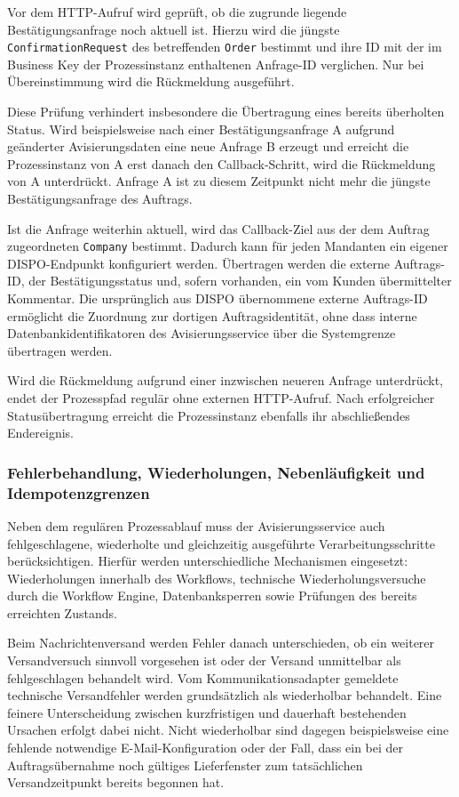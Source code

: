 \documentclass[
  12pt,
  a4paper,
  oneside
]{article}
\begin{document}
Vor dem HTTP-Aufruf wird geprüft, ob die zugrunde liegende
Bestätigungsanfrage noch aktuell ist. Hierzu wird die jüngste
\texttt{ConfirmationRequest} des betreffenden \texttt{Order} bestimmt und ihre
ID mit der im Business Key der Prozessinstanz enthaltenen Anfrage-ID
verglichen. Nur bei Übereinstimmung wird die Rückmeldung ausgeführt.

Diese Prüfung verhindert insbesondere die Übertragung eines bereits überholten
Status. Wird beispielsweise nach einer Bestätigungsanfrage A aufgrund
geänderter Avisierungsdaten eine neue Anfrage B erzeugt und erreicht die
Prozessinstanz von A erst danach den Callback-Schritt, wird die Rückmeldung von
A unterdrückt. Anfrage A ist zu diesem Zeitpunkt nicht mehr die jüngste
Bestätigungsanfrage des Auftrags.

Ist die Anfrage weiterhin aktuell, wird das Callback-Ziel aus der dem Auftrag
zugeordneten \texttt{Company} bestimmt. Dadurch kann für jeden Mandanten ein
eigener DISPO-Endpunkt konfiguriert werden. Übertragen werden die externe
Auftrags-ID, der Bestätigungsstatus und, sofern vorhanden, ein vom Kunden
übermittelter Kommentar. Die ursprünglich aus DISPO übernommene externe
Auftrags-ID ermöglicht die Zuordnung zur dortigen Auftragsidentität, ohne dass
interne Datenbankidentifikatoren des Avisierungsservice über die Systemgrenze
übertragen werden.

Wird die Rückmeldung aufgrund einer inzwischen neueren Anfrage unterdrückt,
endet der Prozesspfad regulär ohne externen HTTP-Aufruf. Nach erfolgreicher
Statusübertragung erreicht die Prozessinstanz ebenfalls ihr abschließendes
Endereignis.

\subsubsection{Fehlerbehandlung, Wiederholungen, Nebenläufigkeit und Idempotenzgrenzen}
\label{sec:fehlerbehandlung}

Neben dem regulären Prozessablauf muss der Avisierungsservice auch
fehlgeschlagene, wiederholte und gleichzeitig ausgeführte Verarbeitungsschritte
berücksichtigen. Hierfür werden unterschiedliche Mechanismen eingesetzt:
Wiederholungen innerhalb des Workflows, technische Wiederholungsversuche durch
die Workflow Engine, Datenbanksperren sowie Prüfungen des bereits erreichten
Zustands.

Beim Nachrichtenversand werden Fehler danach unterschieden, ob ein weiterer
Versandversuch sinnvoll vorgesehen ist oder der Versand unmittelbar als
fehlgeschlagen behandelt wird. Vom Kommunikationsadapter gemeldete technische Versandfehler
werden grundsätzlich als wiederholbar behandelt. Eine feinere
Unterscheidung zwischen kurzfristigen und dauerhaft bestehenden Ursachen
erfolgt dabei nicht. Nicht wiederholbar sind dagegen beispielsweise eine
fehlende notwendige E-Mail-Konfiguration oder der Fall, dass ein bei der
Auftragsübernahme noch gültiges Lieferfenster zum tatsächlichen Versandzeitpunkt
bereits begonnen hat.
\end{document}
